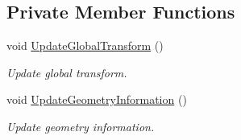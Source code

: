 \subsection*{Private Member Functions}
\begin{DoxyCompactItemize}
\item 
void \hyperlink{class_scene_node_ae7111fc017631027a07f0d0ac9762c52}{Update\+Global\+Transform} ()
\begin{DoxyCompactList}\small\item\em Update global transform. \end{DoxyCompactList}\item 
void \hyperlink{class_scene_node_a37121add3dbbc4dee59497d511be88b7}{Update\+Geometry\+Information} ()
\begin{DoxyCompactList}\small\item\em Update geometry information. \end{DoxyCompactList}\end{DoxyCompactItemize}
